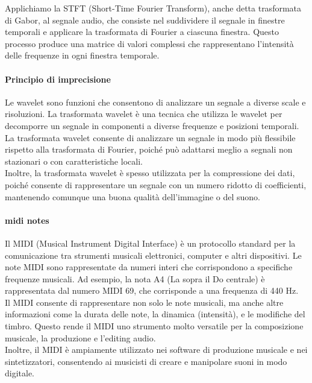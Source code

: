 Applichiamo la STFT (Short-Time Fourier Transform), anche detta trasformata di Gabor, al segnale audio, che consiste nel suddividere il segnale in finestre temporali e applicare la trasformata di Fourier a ciascuna finestra. Questo processo produce una matrice di valori complessi che rappresentano l'intensità delle frequenze in ogni finestra temporale.\\

\paragraph{Principio di imprecisione}

Le wavelet sono funzioni che consentono di analizzare un segnale a diverse scale e risoluzioni. La trasformata wavelet è una tecnica che utilizza le wavelet per decomporre un segnale in componenti a diverse frequenze e posizioni temporali.\\
La trasformata wavelet consente di analizzare un segnale in modo più flessibile rispetto alla trasformata di Fourier, poiché può adattarsi meglio a segnali non stazionari o con caratteristiche locali.\\
Inoltre, la trasformata wavelet è spesso utilizzata per la compressione dei dati, poiché consente di rappresentare un segnale con un numero ridotto di coefficienti, mantenendo comunque una buona qualità dell'immagine o del suono.\\

\paragraph{midi notes}
Il MIDI (Musical Instrument Digital Interface) è un protocollo standard per la comunicazione tra strumenti musicali elettronici, computer e altri dispositivi. Le note MIDI sono rappresentate da numeri interi che corrispondono a specifiche frequenze musicali. Ad esempio, la nota A4 (La sopra il Do centrale) è rappresentata dal numero MIDI 69, che corrisponde a una frequenza di 440 Hz.\\
Il MIDI consente di rappresentare non solo le note musicali, ma anche altre informazioni come la durata delle note, la dinamica (intensità), e le modifiche del timbro. Questo rende il MIDI uno strumento molto versatile per la composizione musicale, la produzione e l'editing audio.\\
Inoltre, il MIDI è ampiamente utilizzato nei software di produzione musicale e nei sintetizzatori, consentendo ai musicisti di creare e manipolare suoni in modo digitale.\\

